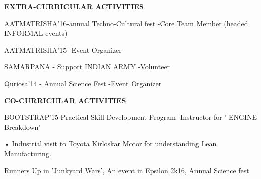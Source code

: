 \documentclass{article}
\begin{document}
\begin{center}

\textbf{\LARGE EXTRA-CURRICULAR ACTIVITIES}
\begin{itemize}
	{\large \item AATMATRISHA'16-annual Techno-Cultural fest
		-Core Team Member (headed INFORMAL events) }
	{\large \item AATMATRISHA'15
		-Event Organizer}
	{\large \item SAMARPANA - Support INDIAN ARMY
		-Volunteer }
	{\large \item Quriosa'14 - Annual Science Fest
		-Event Organizer }
\end{itemize}\vspace{15px}


\textbf{\LARGE CO-CURRICULAR ACTIVITIES}
\begin{enumerate}
	{\large \item BOOTSTRAP'15-Practical Skill Development
		Program
		-Instructor for ' ENGINE Breakdown' }
	
	{\large \item •	Industrial visit to Toyota Kirloskar Motor for understanding Lean Manufacturing. }
	{\large \item Runners Up in 'Junkyard Wars',
		An event in Epsilon 2k16, Annual Science fest }
\end{enumerate}\vspace{15px}
\end{center}
\end{document}
